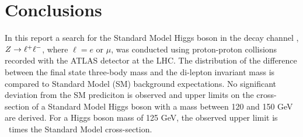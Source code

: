 \section{Conclusions}
\label{sec:conclusion}
In this report a search for the Standard
Model Higgs boson in the decay channel \HToZg, $Z \rightarrow \ell^+ \ell^-$, where
$\ell = e$ or $\mu$, was conducted using proton-proton collisions recorded
with the ATLAS detector at the LHC. The distribution of the difference \dm between 
the final state three-body mass \mllg and the di-lepton invariant mass \mll
is compared to Standard Model (SM) background expectations. No significant
deviation from the SM prediciton is observed and upper limits on the 
cross-section of a Standard Model Higgs boson with a mass between 120 and 150 GeV
are derived. For a Higgs boson mass of 125 GeV, the observed upper limit
is \exclhiggs\ times the Standard Model cross-section.
